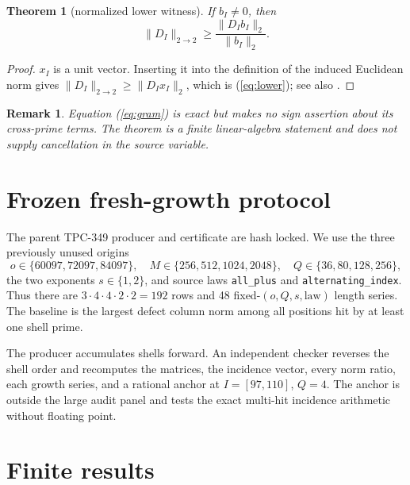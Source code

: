 \documentclass[10pt]{article}
\newtheorem{theorem}{Theorem}
\newtheorem{remark}{Remark}
\begin{document}
\begin{theorem}[normalized lower witness]
If $b_I\ne0$, then
\begin{equation}
 \|D_I\|_{2\to2}\geq
 \frac{\|D_Ib_I\|_2}{\|b_I\|_2}.
 \label{eq:lower}
\end{equation}
\end{theorem}
\begin{proof}
$x_I$ is a unit vector.  Inserting it into the definition of the induced
Euclidean norm gives $\|D_I\|_{2\to2}\geq\|D_Ix_I\|_2$, which is
(\ref{eq:lower}); see also \cite{conway2000}.
\end{proof}

\begin{remark}
Equation (\ref{eq:gram}) is exact but makes no sign assertion about its
cross-prime terms.  The theorem is a finite linear-algebra statement and does
not supply cancellation in the source variable.
\end{remark}

\section{Frozen fresh-growth protocol}

The parent TPC-349 producer and certificate are hash locked.  We use the
three previously unused origins
\[
 o\in\{60097,72097,84097\},
 \quad M\in\{256,512,1024,2048\},
 \quad Q\in\{36,80,128,256\},
\]
the two exponents $s\in\{1,2\}$, and source laws
\texttt{all\_plus} and \texttt{alternating\_index}.  Thus there are
$3\cdot4\cdot4\cdot2\cdot2=192$ rows and 48 fixed-$(o,Q,s,\text{law})$
length series.  The baseline is the largest defect column norm among all
positions hit by at least one shell prime.

The producer accumulates shells forward.  An independent checker reverses the
shell order and recomputes the matrices, the incidence vector, every norm
ratio, each growth series, and a rational anchor at $I=[97,110]$, $Q=4$.
The anchor is outside the large audit panel and tests the exact multi-hit
incidence arithmetic without floating point.

\section{Finite results}
\end{document}
